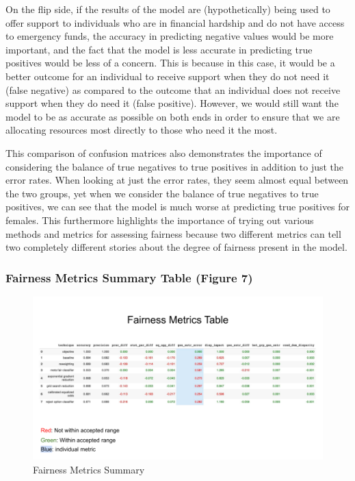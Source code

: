 \documentclass[water,article,submit,moreauthors,pdftex]{mdpi}
\begin{document}
On the flip side, if the results of the model are (hypothetically) being
used to offer support to individuals who are in financial hardship and
do not have access to emergency funds, the accuracy in predicting
negative values would be more important, and the fact that the model is
less accurate in predicting true positives would be less of a concern.
This is because in this case, it would be a better outcome for an
individual to receive support when they do not need it (false negative)
as compared to the outcome that an individual does not receive support
when they do need it (false positive). However, we would still want the
model to be as accurate as possible on both ends in order to ensure that
we are allocating resources most directly to those who need it the most.

This comparison of confusion matrices also demonstrates the importance
of considering the balance of true negatives to true positives in
addition to just the error rates. When looking at just the error rates,
they seem almost equal between the two groups, yet when we consider the
balance of true negatives to true positives, we can see that the model
is much worse at predicting true positives for females. This furthermore
highlights the importance of trying out various methods and metrics for
assessing fairness because two different metrics can tell two completely
different stories about the degree of fairness present in the model.

\hypertarget{fairness-metrics-summary-table-figure-7}{%
\subsubsection{Fairness Metrics Summary Table (Figure
7)}\label{fairness-metrics-summary-table-figure-7}}

\begin{figure}
\centering
\includegraphics[width=\textwidth,height=0.4\textheight]{images/FairnessMetricsSummary.png}
\caption{Fairness Metrics Summary}
\end{figure}
\end{document}
